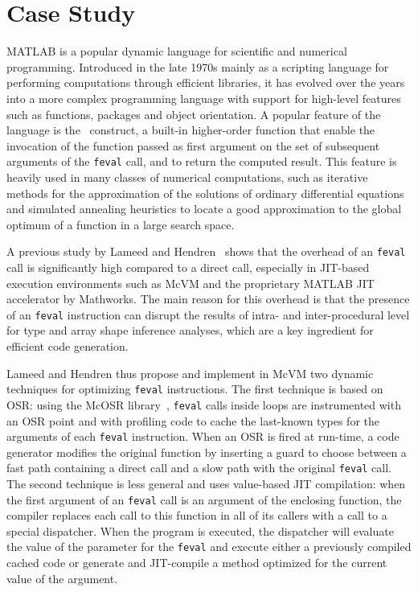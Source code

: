 \section{Case Study}
\label{case-study}

MATLAB is a popular dynamic language for scientific and numerical programming. Introduced in the late 1970s mainly as a scripting language for performing computations through efficient libraries, it has evolved over the years into a more complex programming language with support for high-level features such as functions, packages and object orientation. A popular feature of the language is the \feval\ construct, a built-in higher-order function that enable the invocation of the function passed as first argument on the set of subsequent arguments of the {\tt feval} call, and to return the computed result. This feature is heavily used in many classes of numerical computations, such as iterative methods for the approximation of the solutions of ordinary differential equations and simulated annealing heuristics to locate a good approximation to the global optimum of a function in a large search space.

A previous study by Lameed and Hendren~\cite{lameed2013feval} shows that the overhead of an {\tt feval} call is significantly high compared to a direct call, especially in JIT-based execution environments such as McVM and the proprietary MATLAB JIT accelerator by Mathworks. The main reason for this overhead is that the presence of an {\tt feval} instruction can disrupt the results of intra- and inter-procedural level for type and array shape inference analyses, which are a key ingredient for efficient code generation.

Lameed and Hendren thus propose and implement in McVM two dynamic techniques for optimizing {\tt feval} instructions. The first technique is based on OSR: using the McOSR library~\cite{lameed2013modular}, {\tt feval} calls inside loops are instrumented with an OSR point and with profiling code to cache the last-known types for the arguments of each {\tt feval} instruction. When an OSR is fired at run-time, a code generator modifies the original function by inserting a guard to choose between a fast path containing a direct call and a slow path with the original {\tt feval} call. The second technique is less general and uses value-based JIT compilation: when the first argument of an {\tt feval} call is an argument of the enclosing function, the compiler replaces each call to this function in all of its callers with a call to a special dispatcher. When the program is executed, the dispatcher will evaluate the value of the parameter for the {\tt feval} and execute either a previously compiled cached code or generate and JIT-compile a method optimized for the current value of the argument.

